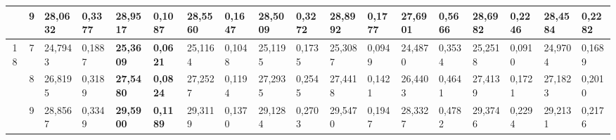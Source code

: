 \documentclass[conference]{IEEEtran}
\begin{document}
\begin{table*}[]
\begin{tabular}{|cc|ll|ll|ll|ll|ll|ll|ll|ll|}
		\multicolumn{1}{|c|}{}                    & 9          & \multicolumn{1}{l|}{28,0632}           & 0,3377                            & \multicolumn{1}{l|}{\textbf{28,9517}}  & \textbf{0,1087}                   & \multicolumn{1}{l|}{28,5560}           & 0,1647                            & \multicolumn{1}{l|}{28,5009}           & 0,3272                            & \multicolumn{1}{l|}{28,8992}           & 0,1777                            & \multicolumn{1}{l|}{27,6901}           & 0,5666                            & \multicolumn{1}{l|}{28,6982}           & 0,2246                            & \multicolumn{1}{l|}{28,4584}           & 0,2282                            \\ \hline
		\multicolumn{1}{|c|}{\multirow{3}{*}{18}} & 7          & \multicolumn{1}{l|}{24,7943}           & 0,1887                            & \multicolumn{1}{l|}{\textbf{25,3609}}  & \textbf{0,0621}                   & \multicolumn{1}{l|}{25,1164}           & 0,1048                            & \multicolumn{1}{l|}{25,1195}           & 0,1735                            & \multicolumn{1}{l|}{25,3087}           & 0,0949                            & \multicolumn{1}{l|}{24,4870}           & 0,3534                            & \multicolumn{1}{l|}{25,2518}           & 0,0910                            & \multicolumn{1}{l|}{24,9704}           & 0,1689                            \\ \cline{2-18} 
		\multicolumn{1}{|c|}{}                    & 8          & \multicolumn{1}{l|}{26,8195}           & 0,3189                            & \multicolumn{1}{l|}{\textbf{27,5480}}  & \textbf{0,0824}                   & \multicolumn{1}{l|}{27,2527}           & 0,1194                            & \multicolumn{1}{l|}{27,2935}           & 0,2545                            & \multicolumn{1}{l|}{27,4418}           & 0,1421                            & \multicolumn{1}{l|}{26,4403}           & 0,4641                            & \multicolumn{1}{l|}{27,4139}           & 0,1721                            & \multicolumn{1}{l|}{27,1823}           & 0,2010                            \\ \cline{2-18} 
		\multicolumn{1}{|c|}{}                    & 9          & \multicolumn{1}{l|}{28,8567}           & 0,3349                            & \multicolumn{1}{l|}{\textbf{29,5900}}  & \textbf{0,1189}                   & \multicolumn{1}{l|}{29,3119}           & 0,1370                            & \multicolumn{1}{l|}{29,1284}           & 0,2703                            & \multicolumn{1}{l|}{29,5470}           & 0,1947                            & \multicolumn{1}{l|}{28,3327}           & 0,4782                            & \multicolumn{1}{l|}{29,3746}           & 0,2294                            & \multicolumn{1}{l|}{29,2131}           & 0,2176                            \\ \hline

\end{tabular}
\end{table*}
\end{document}
